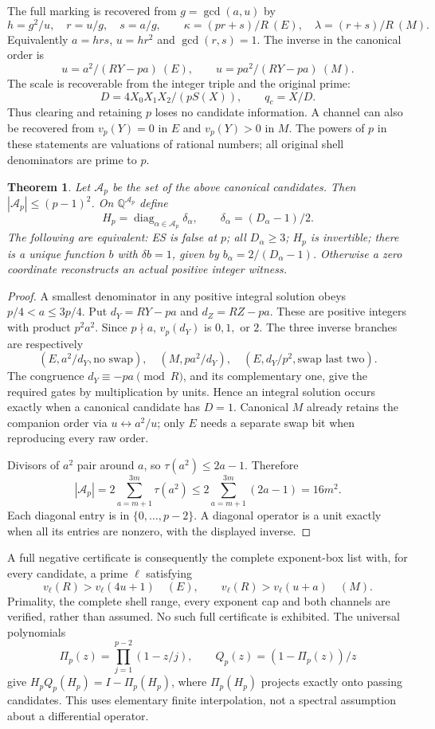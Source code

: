 \documentclass[11pt]{amsart}
\newtheorem{theorem}{Theorem}\newtheorem{proposition}[theorem]{Proposition}
\theoremstyle{remark}\newtheorem{remark}[theorem]{Remark}
\newcommand{\Q}{\mathbb Q}\newcommand{\Z}{\mathbb Z}
\begin{document}
The full marking is recovered from $g=\gcd(a,u)$ by
\[
 h=g^2/u,\quad r=u/g,\quad s=a/g,
 \qquad \kappa=(pr+s)/R\ (E),\quad\lambda=(r+s)/R\ (M).
\]
Equivalently $a=hrs$, $u=hr^2$ and $\gcd(r,s)=1$.
The inverse in the canonical order is
\[
 u=a^2/(RY-pa)\ (E),\qquad u=pa^2/(RY-pa)\ (M).
\]
The scale is recoverable from the integer triple and the original prime:
\[
 \boxed{D=4X_0X_1X_2/(pS(X)),\qquad q_c=X/D.}
\]
Thus clearing and retaining $p$ loses no candidate information. A channel
can also be recovered from $v_p(Y)=0$ in $E$ and $v_p(Y)>0$ in $M$.
The powers of $p$ in these statements are valuations of rational numbers;
all original shell denominators are prime to $p$.

\begin{theorem}
Let $\mathscr A_p$ be the set of the above canonical candidates. Then
$|\mathscr A_p|\le(p-1)^2$. On $\Q^{\mathscr A_p}$ define
\[
 H_p=\operatorname{diag}_{\alpha\in\mathscr A_p}
 \delta_\alpha,\qquad \delta_\alpha=(D_\alpha-1)/2.
\]
The following are equivalent: ES is false at $p$; all $D_\alpha\ge3$;
$H_p$ is invertible; there is a unique function $b$ with
$\delta b=1$, given by $b_\alpha=2/(D_\alpha-1)$.
Otherwise a zero coordinate reconstructs an actual positive integer witness.
\end{theorem}
\begin{proof}
A smallest denominator in any positive integral solution obeys
$p/4<a\le3p/4$. Put $d_Y=RY-pa$ and $d_Z=RZ-pa$. These are positive
integers with product $p^2a^2$. Since $p\nmid a$, $v_p(d_Y)$ is $0,1,$
or $2$. The three inverse branches are respectively
\[
 (E,a^2/d_Y,\text{no swap}),\quad
 (M,pa^2/d_Y),\quad
 (E,d_Y/p^2,\text{swap last two}).
\]
The congruence $d_Y\equiv-pa\pmod R$, and its complementary one, give the
required gates by multiplication by units. Hence an integral solution occurs
exactly when a canonical candidate has $D=1$. Canonical $M$ already retains
the companion order via $u\leftrightarrow a^2/u$; only $E$ needs a separate
swap bit when reproducing every raw order.

Divisors of $a^2$ pair around $a$, so $\tau(a^2)\le2a-1$. Therefore
\[
 |\mathscr A_p|=2\sum_{a=m+1}^{3m}\tau(a^2)
 \le2\sum_{a=m+1}^{3m}(2a-1)=16m^2.
\]
Each diagonal entry is in $\{0,\ldots,p-2\}$. A diagonal operator is a
unit exactly when all its entries are nonzero, with the displayed inverse.
\end{proof}

A full negative certificate is consequently the complete exponent-box list
with, for every candidate, a prime $\ell$ satisfying
\[
 v_\ell(R)>v_\ell(4u+1)\quad(E),\qquad
 v_\ell(R)>v_\ell(u+a)\quad(M).
\]
Primality, the complete shell range, every exponent cap and both channels
are verified, rather than assumed. No such full certificate is exhibited.
The universal polynomials
\[
 \Pi_p(z)=\prod_{j=1}^{p-2}(1-z/j),\qquad
 Q_p(z)=(1-\Pi_p(z))/z
\]
give $H_pQ_p(H_p)=I-\Pi_p(H_p)$, where $\Pi_p(H_p)$ projects exactly
onto passing candidates. This uses elementary finite interpolation, not a
spectral assumption about a differential operator.
\end{document}
